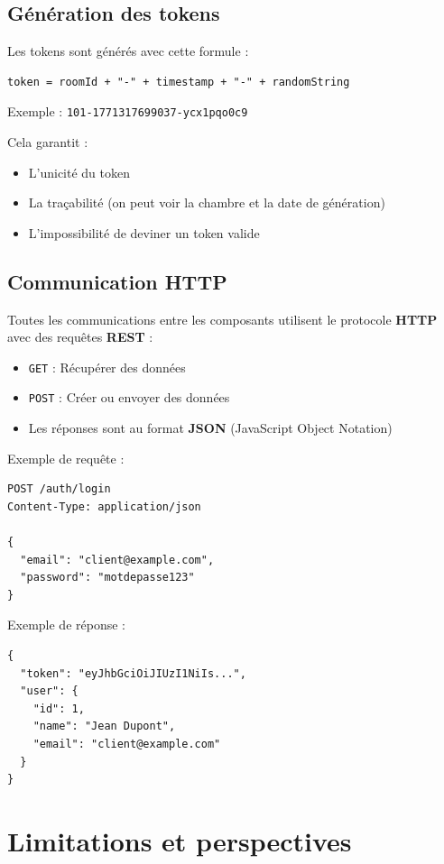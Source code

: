 \documentclass[11pt,a4paper]{article}
\begin{document}
\subsection{Génération des tokens}

Les tokens sont générés avec cette formule :
\begin{verbatim}
token = roomId + "-" + timestamp + "-" + randomString
\end{verbatim}

Exemple : \texttt{101-1771317699037-ycx1pqo0c9}

Cela garantit :
\begin{itemize}
    \item L'unicité du token
    \item La traçabilité (on peut voir la chambre et la date de génération)
    \item L'impossibilité de deviner un token valide
\end{itemize}

\subsection{Communication HTTP}

Toutes les communications entre les composants utilisent le protocole \textbf{HTTP} avec des requêtes \textbf{REST} :

\begin{itemize}
    \item \texttt{GET} : Récupérer des données
    \item \texttt{POST} : Créer ou envoyer des données
    \item Les réponses sont au format \textbf{JSON} (JavaScript Object Notation)
\end{itemize}

Exemple de requête :
\begin{verbatim}
POST /auth/login
Content-Type: application/json

{
  "email": "client@example.com",
  "password": "motdepasse123"
}
\end{verbatim}

Exemple de réponse :
\begin{verbatim}
{
  "token": "eyJhbGciOiJIUzI1NiIs...",
  "user": {
    "id": 1,
    "name": "Jean Dupont",
    "email": "client@example.com"
  }
}
\end{verbatim}

\section{Limitations et perspectives}
\end{document}

